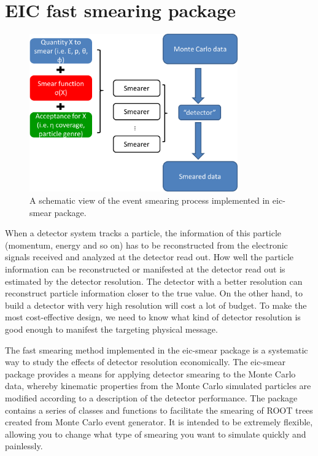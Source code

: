 %

\section{EIC fast smearing package}


\begin{figure}
\centering
\includegraphics[width=0.8\textwidth]{plots/chpt5/smearing framework.png}
\caption[An illustration of the event smearing strategy in the eic-smear package] {
A schematic view of the event smearing process implemented in eic-smear package. 
}
\label{fig:smear_layout}
\end{figure}


When a detector system tracks a particle, the information of this particle
(momentum, energy and so on) has to be reconstructed from the electronic
signals received and analyzed at the detector read out. How well the particle
information can be reconstructed or manifested at the detector read out is
estimated by the detector resolution. The detector with a better resolution
can reconstruct particle information closer to the true value. On
the other hand, to build a detector with very high resolution will cost a lot
of budget. To make the most cost-effective design, we need to know what kind
of detector resolution is good enough to manifest the targeting physical message.

The fast smearing method implemented in the eic-smear package is a systematic
way to study the effects of detector resolution economically. The eic-smear
package provides a means for applying detector smearing to the Monte Carlo
data, whereby kinematic properties from the Monte Carlo simulated particles are modified according
to a description of the detector performance. The package contains a series of
classes and functions to facilitate the smearing of ROOT trees created from
Monte Carlo event generator. It is intended to be extremely flexible,
allowing you to change what type of smearing you want to simulate quickly and
painlessly.


